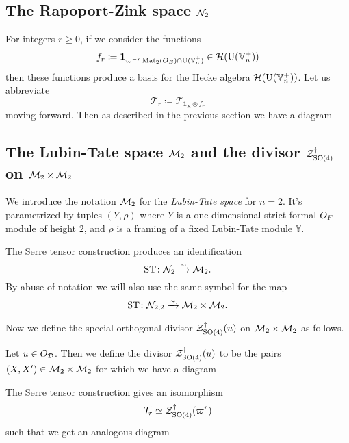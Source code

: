 \subsection{The Rapoport-Zink space $\mathcal N_2$}
For integers $r \ge 0$, if we consider the functions
\[ f_r \coloneqq \mathbf{1}_{\varpi^{-r} \operatorname{Mat}_2(O_E) \cap \operatorname{U}(\mathbb V_n^+)} \in \mathcal H(\operatorname{U}(\mathbb V_n^+)) \]
then these functions produce a basis for the Hecke algebra $\mathcal H(\operatorname{U}(\mathbb V_n^+))$.
Let us abbreviate
\[ \mathcal{T}_r \coloneqq \mathcal{T}_{\mathbf{1}_K \otimes f_r} \]
moving forward.
Then as described in the previous section we have a diagram
\begin{center}
\end{center}

\subsection{The Lubin-Tate space $\mathcal M_2$ and the divisor $\mathcal Z^{\dagger}_{\operatorname{SO}(4)}$ on $\mathcal M_2 \times \mathcal M_2$}
We introduce the notation $\mathcal M_2$ for the \emph{Lubin-Tate space} for $n = 2$.
It's parametrized by tuples $(Y, \rho)$
where $Y$ is a one-dimensional strict formal $O_F$-module of height $2$,
and $\rho$ is a framing of a fixed Lubin-Tate module $\mathbb{Y}$.

\begin{proposition}
  The Serre tensor construction produces an identification
  \[ \operatorname{ST} \colon \mathcal N_2 \xrightarrow{\sim} \mathcal M_2. \]
  By abuse of notation we will also use the same symbol for the map
  \[ \operatorname{ST} \colon \mathcal N_{2,2} \xrightarrow{\sim} \mathcal M_2 \times \mathcal M_2. \]
\end{proposition}

Now we define the special orthogonal divisor $\mathcal Z^{\dagger}_{\operatorname{SO}(4)}(u)$
on $\mathcal M_2 \times \mathcal M_2$ as follows.
\begin{definition}
  Let $u \in O_\mathcal D$.
  Then we define the divisor $\mathcal Z^{\dagger}_{\operatorname{SO}(4)}(u)$ to be
  the pairs $(X, X') \in \mathcal M_2 \times \mathcal M_2$
  for which we have a diagram
  \begin{center}
  \end{center}
\end{definition}
\begin{conjecture}
  The Serre tensor construction gives an isomorphism
  \[ \mathcal{T}_r \simeq \mathcal Z^{\dagger}_{\operatorname{SO}(4)}(\varpi^r) \]
  such that we get an analogous diagram
  \begin{center}
  \end{center}
\end{conjecture}

